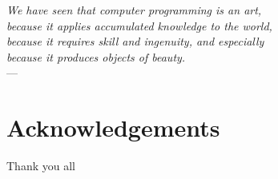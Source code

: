 
\begin{flushright}{\slshape    
    We have seen that computer programming is an art, \\ 
    because it applies accumulated knowledge to the world, \\ 
    because it requires skill and ingenuity, and especially \\
    because it produces objects of beauty.} \\ \medskip
    ---  \citep{knuth:1974}
\end{flushright}


\begingroup

\let\clearpage\relax
\let\cleardoublepage\relax
\let\cleardoublepage\relax

\chapter*{Acknowledgements} %

Thank you all

\endgroup
